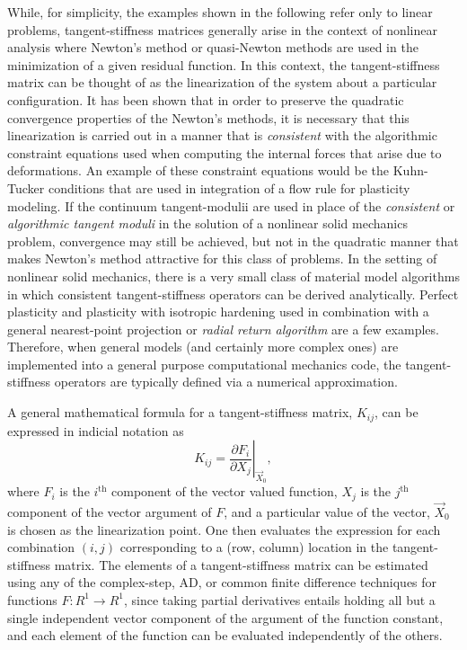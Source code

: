 \documentclass[preprint,12pt]{elsarticle}
\begin{document}
While, for simplicity, the examples shown in the following refer only to linear problems, tangent-stiffness matrices generally arise in the context of nonlinear analysis where Newton's method or quasi-Newton methods are used in the minimization of a given residual function.  In this context, the tangent-stiffness matrix can be thought of as the linearization of the system about a particular configuration.  It has been shown \cite{hughes1978consistent,hughes1978unconditionally} that in order to preserve the quadratic convergence properties of the Newton's methods, it is necessary that this linearization is carried out in a manner that is \emph{consistent} with the algorithmic constraint equations used when computing the internal forces that arise due to deformations.  An example of these constraint equations would be the Kuhn-Tucker conditions \cite{simo1998} that are used in integration of a flow rule for plasticity modeling.  If the continuum tangent-modulii are used in place of the \emph{consistent} or \emph{algorithmic tangent moduli} in the solution of a nonlinear solid mechanics problem, convergence may still be achieved, but not in the quadratic manner that makes Newton's method attractive for this class of problems.  In the setting of nonlinear solid mechanics, there is a very small class of material model algorithms in which consistent tangent-stiffness operators can be derived analytically.  Perfect plasticity and plasticity with isotropic hardening used in combination with a general nearest-point projection or \emph{radial return algorithm} are a few examples.  Therefore, when general models (and certainly more complex ones) are implemented into a general purpose computational mechanics code, the tangent-stiffness operators are typically defined via a numerical approximation.  

A general mathematical formula for a tangent-stiffness matrix, $K_{ij}$, can be expressed in indicial notation as 
%
\begin{equation} K_{ij} = \left. \frac{\partial F_i}{\partial
X_j}\right|_{\vec{X}_0}, \end{equation}
%
where $F_i$ is the $i^{\mbox{th}}$ component of the vector valued function, $X_j$ is the $j^{\mbox{th}}$ component of the vector argument of $F$, and a particular value of the vector, $\vec{X}_0$ is chosen as the linearization point. One then evaluates the expression for each combination $(i, j)$ corresponding to a (row, column) location in the tangent-stiffness matrix. The elements of a tangent-stiffness matrix can be estimated using any of the complex-step, AD, or common finite difference techniques for functions $F:R^1 \rightarrow R^1$, since taking partial derivatives entails holding all but a single independent vector component of the argument of the function constant, and each element of the function can be evaluated independently of the others. \\ 
\end{document}
